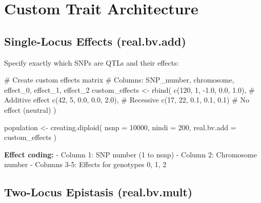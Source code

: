 \documentclass[
  letterpaper,
]{book}
\newenvironment{Shaded}{\begin{snugshade}}{\end{snugshade}}
\newcommand{\AttributeTok}[1]{\textcolor[rgb]{0.40,0.45,0.13}{#1}}
\newcommand{\CommentTok}[1]{\textcolor[rgb]{0.37,0.37,0.37}{#1}}
\newcommand{\DecValTok}[1]{\textcolor[rgb]{0.68,0.00,0.00}{#1}}
\newcommand{\FloatTok}[1]{\textcolor[rgb]{0.68,0.00,0.00}{#1}}
\newcommand{\FunctionTok}[1]{\textcolor[rgb]{0.28,0.35,0.67}{#1}}
\newcommand{\NormalTok}[1]{\textcolor[rgb]{0.00,0.23,0.31}{#1}}
\newcommand{\OtherTok}[1]{\textcolor[rgb]{0.00,0.23,0.31}{#1}}
\newcommand{\SpecialCharTok}[1]{\textcolor[rgb]{0.37,0.37,0.37}{#1}}
\begin{document}
\section{Custom Trait Architecture}\label{sec-custom-traits}

\subsection{Single-Locus Effects
(real.bv.add)}\label{single-locus-effects-real.bv.add}

Specify exactly which SNPs are QTLs and their effects:

\begin{Shaded}
\begin{Highlighting}[]
\CommentTok{\# Create custom effects matrix}
\CommentTok{\# Columns: SNP\_number, chromosome, effect\_0, effect\_1, effect\_2}
\NormalTok{custom\_effects }\OtherTok{\textless{}{-}} \FunctionTok{rbind}\NormalTok{(}
  \FunctionTok{c}\NormalTok{(}\DecValTok{120}\NormalTok{,  }\DecValTok{1}\NormalTok{, }\SpecialCharTok{{-}}\FloatTok{1.0}\NormalTok{,  }\FloatTok{0.0}\NormalTok{,  }\FloatTok{1.0}\NormalTok{),   }\CommentTok{\# Additive effect}
  \FunctionTok{c}\NormalTok{(}\DecValTok{42}\NormalTok{,   }\DecValTok{5}\NormalTok{,  }\FloatTok{0.0}\NormalTok{,  }\FloatTok{0.0}\NormalTok{,  }\FloatTok{2.0}\NormalTok{),   }\CommentTok{\# Recessive}
  \FunctionTok{c}\NormalTok{(}\DecValTok{17}\NormalTok{,  }\DecValTok{22}\NormalTok{,  }\FloatTok{0.1}\NormalTok{,  }\FloatTok{0.1}\NormalTok{,  }\FloatTok{0.1}\NormalTok{)    }\CommentTok{\# No effect (neutral)}
\NormalTok{)}

\NormalTok{population }\OtherTok{\textless{}{-}} \FunctionTok{creating.diploid}\NormalTok{(}
  \AttributeTok{nsnp =} \DecValTok{10000}\NormalTok{,}
  \AttributeTok{nindi =} \DecValTok{200}\NormalTok{,}
  \AttributeTok{real.bv.add =}\NormalTok{ custom\_effects}
\NormalTok{)}
\end{Highlighting}
\end{Shaded}

\textbf{Effect coding:} - Column 1: SNP number (1 to nsnp) - Column 2:
Chromosome number - Columns 3-5: Effects for genotypes 0, 1, 2

\subsection{Two-Locus Epistasis
(real.bv.mult)}\label{two-locus-epistasis-real.bv.mult}
\end{document}
